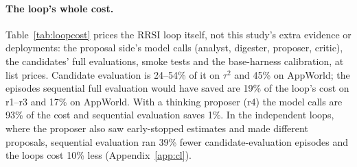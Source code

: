\documentclass[11pt]{article}
\begin{document}
\begin{table}[t]
\centering
\small
\setlength{\tabcolsep}{3pt}
\caption{Coverage of $\pm2$ standard-error intervals: evolve $\Delta S$ / deployment gain, averaged over candidates (200 evidence draws each). Full evaluation covers its own $\Delta S$ by construction.}
\label{tab:coverage}
\end{table}

\begin{table}[t]
\centering
\small
\setlength{\tabcolsep}{3pt}
\caption{Offset of each evidence type at 40 episodes from full evaluation's evolve $\Delta S$: the mean over candidates of the mean of 200 draws minus $\Delta S$, in points, with a 90\% bootstrap interval over candidates; the share of candidates with a positive offset; the draws' standard deviation against their mean reported standard error (points); and the share of draws whose $\pm2$ SE interval covers the draws' own mean (post hoc).}
\label{tab:bias}
\end{table}

\paragraph{The loop's whole cost.} Table~\ref{tab:loopcost} prices the RRSI loop itself, not this study's extra evidence or deployments: the proposal side's model calls (analyst, digester, proposer, critic), the candidates' full evaluations, smoke tests and the base-harness calibration, at list prices. Candidate evaluation is 24--54\% of it on $\tau^2$ and 45\% on AppWorld; the episodes sequential full evaluation would have saved are 19\% of the loop's cost on r1--r3 and 17\% on AppWorld. With a thinking proposer (r4) the model calls are 93\% of the cost and sequential evaluation saves 1\%. In the independent loops, where the proposer also saw early-stopped estimates and made different proposals, sequential evaluation ran 39\% fewer candidate-evaluation episodes and the loops cost 10\% less (Appendix~\ref{app:cl}).
\end{document}
